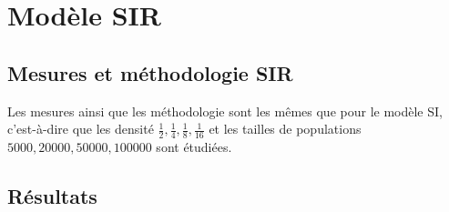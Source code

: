 \chapter{Modèle SIR} \label{ch:intro}

\section{Mesures et méthodologie SIR}

Les mesures ainsi que les méthodologie sont les mêmes que pour le modèle SI, c'est-à-dire que les densité $\frac{1}{2},\frac{1}{4},\frac{1}{8},\frac{1}{16}$ et les tailles de populations $5000,20000,50000,100000$ sont étudiées.

\section{Résultats}

